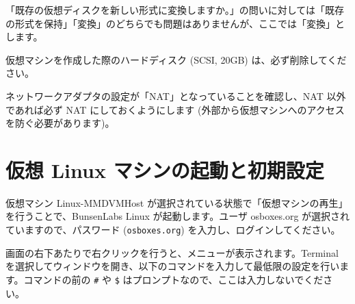 \documentclass[a4j,oneside]{ujbook}
\begin{document}
「既存の仮想ディスクを新しい形式に変換しますか。」の問いに対しては「既存の形式を保持」「変換」のどちらでも問題はありませんが、ここでは「変換」とします。

仮想マシンを作成した際のハードディスク (SCSI, 20GB) は、必ず削除してください。

ネットワークアダプタの設定が「NAT」となっていることを確認し、NAT 以外であれば必ず NAT にしておくようにします (外部から仮想マシンへのアクセスを防ぐ必要があります)。

\section{仮想 Linux マシンの起動と初期設定}

仮想マシン Linux-MMDVMHost が選択されている状態で「仮想マシンの再生」を行うことで、BunsenLabs Linux が起動します。ユーザ osboxes.org が選択されていますので、パスワード (\verb+osboxes.org+) を入力し、ログインしてください。

画面の右下あたりで右クリックを行うと、メニューが表示されます。Terminal を選択してウィンドウを開き、以下のコマンドを入力して最低限の設定を行います。コマンドの前の \verb+#+ や \verb+$+ はプロンプトなので、ここは入力しないでください。
\end{document}
